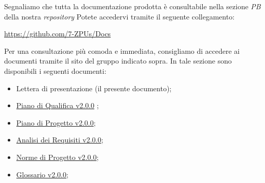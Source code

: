 \documentclass[a4paper,12pt]{article}
\begin{document}
Segnaliamo che tutta la documentazione prodotta è consultabile nella sezione \textit{PB} della nostra \textit{repository}
Potete accedervi tramite il seguente collegamento:

\begin{center}
\href{https://github.com/7-ZPUs/Docs}{https://github.com/7-ZPUs/Docs}
\end{center}
Per una consultazione più comoda e immediata, consigliamo di accedere ai documenti tramite il sito del gruppo indicato sopra.
\newpage
\noindent In tale sezione sono disponibili i seguenti documenti:
\vspace{0.3cm}

\begin{itemize}
    \item Lettera di presentazione (il presente documento);
    \item \href{https://7-zpus.github.io/Docs/assets/3_PB/DocumentiEsterni/PianoDiQualifica.pdf}{Piano di Qualifica v2.0.0} ;
    \item \href{https://7-zpus.github.io/Docs/assets/3_PB/DocumentiEsterni/PianoDiProgetto.pdf}{Piano di Progetto v2.0.0};
    \item \href{https://7-zpus.github.io/Docs/assets/3_PB/DocumentiEsterni/AnalisiDeiRequisiti.pdf}{Analisi dei Requisiti v2.0.0};
    \item \href{https://7-zpus.github.io/Docs/assets/3_PB/DocumentiInterni/NormeDiProgetto.pdf}{Norme di Progetto v2.0.0};
    \item \href{https://7-zpus.github.io/Docs/assets/3_PB/DocumentiInterni/Glossario.pdf}{Glossario v2.0.0};
\end{itemize}
\end{document}
